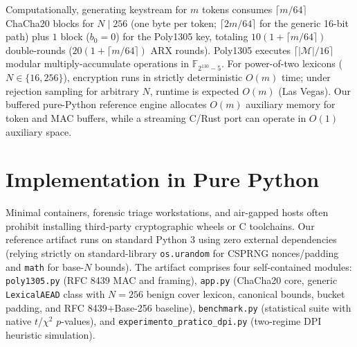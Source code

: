 \documentclass[conference]{IEEEtran}
\begin{document}
\begin{table}[htbp]
\caption{Lexical Expansion Ratio $\beta(m, N)$ and Base-$N$ Framing Properties}
\label{tab:expansion}
\centering
{}
\end{table}

Computationally, generating keystream for $m$ tokens consumes $\lceil m / 64 \rceil$ ChaCha20 blocks for $N \mid 256$ (one byte per token; $\lceil 2m / 64 \rceil$ for the generic 16-bit path) plus $1$ block ($b_0=0$) for the Poly1305 key, totaling $10(1 + \lceil m / 64 \rceil)$ double-rounds ($20(1 + \lceil m / 64 \rceil)$ ARX rounds). Poly1305 executes $\lceil |\mathcal{M}| / 16 \rceil$ modular multiply-accumulate operations in $\mathbb{F}_{2^{130}-5}$. For power-of-two lexicons ($N \in \{16, 256\}$), encryption runs in strictly deterministic $O(m)$ time; under rejection sampling for arbitrary $N$, runtime is expected $O(m)$ (Las Vegas). Our buffered pure-Python reference engine allocates $O(m)$ auxiliary memory for token and MAC buffers, while a streaming C/Rust port can operate in $O(1)$ auxiliary space.

\section{Implementation in Pure Python}
\label{sec:impl}

Minimal containers, forensic triage workstations, and air-gapped hosts often prohibit installing third-party cryptographic wheels or C toolchains. Our reference artifact runs on standard Python 3 using zero external dependencies (relying strictly on standard-library \texttt{os.urandom} for CSPRNG nonces/padding and \texttt{math} for base-$N$ bounds). The artifact comprises four self-contained modules: \texttt{poly1305.py} (RFC 8439 MAC and framing), \texttt{app.py} (ChaCha20 core, generic \texttt{LexicalAEAD} class with $N=256$ benign cover lexicon, canonical bounds, bucket padding, and RFC 8439+Base-256 baseline), \texttt{benchmark.py} (statistical suite with native $t$/$\chi^2$ $p$-values), and \texttt{experimento\_pratico\_dpi.py} (two-regime DPI heuristic simulation).
\end{document}
